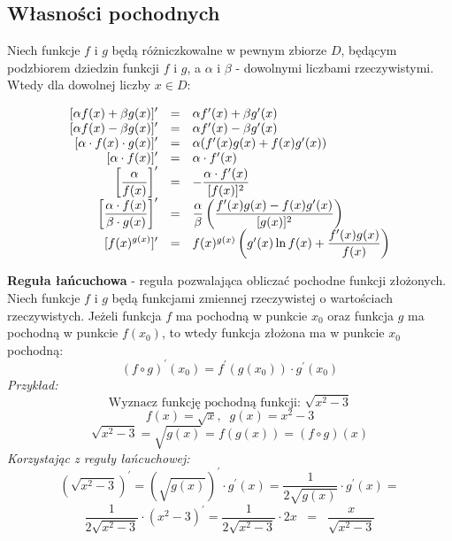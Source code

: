 \documentclass[14pt,a4paper]{extarticle}
\begin{document}
\subsection{Własności pochodnych}
Niech funkcje $f$ i $g$ będą różniczkowalne w pewnym zbiorze $D$, będącym podzbiorem dziedzin
funkcji $f$ i $g$, a $\alpha$ i $\beta$ - dowolnymi liczbami rzeczywistymi. Wtedy dla dowolnej liczby $x \in D$:

{%
\renewcommand{\arraystretch}{2}

\begin{equation*}
\begin{array}{rcl}
   \displaystyle[\alpha f(x) + \beta g(x)]^{\prime} & = & \alpha f^{\prime}(x) + \beta g^{\prime}(x) \\
   \displaystyle[\alpha f(x) - \beta g(x)]^{\prime} & = & \alpha f^{\prime}(x) - \beta g^{\prime}(x) \\
   \displaystyle[\alpha \cdot f(x)\cdot g(x)]^{\prime} & = & \alpha (f^{\prime}(x) g(x) + f(x) g^{\prime}(x)) \\
   \displaystyle[\alpha \cdot f(x)]^{\prime} & = & \alpha \cdot f^{\prime}(x) \\
   \displaystyle\left[\frac{\alpha}{f(x)}\right]^{\prime} & = & -\dfrac{\alpha \cdot f^{\prime}(x)}{[f(x)]^{2}} \\[\medskipamount]
   \displaystyle\left[\frac{\alpha \cdot f(x)}{\beta \cdot g(x)}\right]^{\prime} & = & \dfrac{\alpha}{\beta} \left( \dfrac{ f^{\prime}(x) g(x) - f(x) g^{\prime}(x)}{[g(x)]^{2}}\right)\\
   \displaystyle [f(x)^{g(x)}]^{\prime} & = & f(x)^{g(x)}\left(g^{\prime}(x)\ln f(x) + \dfrac{f^{\prime}(x)g(x)}{f(x)}\right)
\end{array}   
\end{equation*}

}%

\noindent\textbf{Reguła łańcuchowa} - reguła pozwalająca obliczać pochodne funkcji złożonych.
Niech funkcje $f$ i $g$ będą funkcjami zmiennej rzeczywistej o wartościach rzeczywistych.
Jeżeli funkcja $f$ ma pochodną w punkcie $x_{0}$ oraz funkcja $g$ ma pochodną w punkcie $f(x_{0})$,
to wtedy funkcja złożona ma w punkcie $x_{0}$ pochodną:
$$(f\circ g)^{\prime}(x_{0}) = f^{\prime}(g(x_{0})) \cdot g^{\prime}(x_{0})$$
\textit{Przykład:}
$$\text{Wyznacz funkcję pochodną funkcji: }\sqrt{x^{2}-3}$$
$$f(x) = \sqrt{x},\;\; g(x) = x^{2}-3$$
$$\sqrt{x^{2}-3} = \sqrt{g(x)} = f(g(x)) = (f \circ g)(x)$$
\textit{Korzystając z reguły łańcuchowej:}
$$(\sqrt{x^{2}-3})^{\prime} = \left(\sqrt{g(x)}\right)^{\prime}\cdot g^{\prime}(x) = \frac{1}{2\sqrt{g(x)}} \cdot g^{\prime}(x) = $$
$$\frac{1}{2\sqrt{x^{2} - 3}} \cdot (x^{2}-3)^{\prime} = \frac{1}{2\sqrt{x^{2} - 3}} \cdot 2x \;\;=\;\; \frac{x}{\sqrt{x^{2} - 3}}$$
\end{document}
